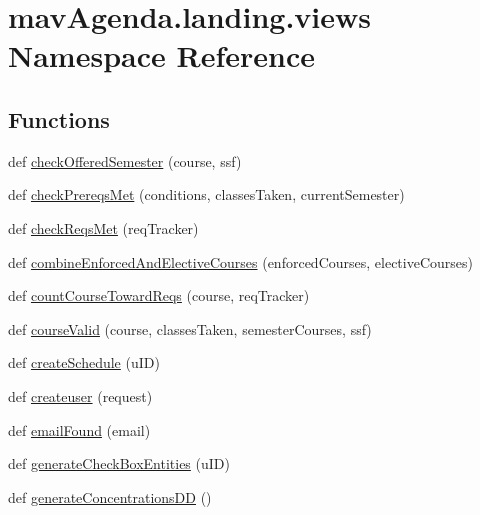 \hypertarget{namespacemavAgenda_1_1landing_1_1views}{}\section{mav\+Agenda.\+landing.\+views Namespace Reference}
\label{namespacemavAgenda_1_1landing_1_1views}
\subsection*{Functions}
\begin{DoxyCompactItemize}
\item 
def \mbox{\hyperlink{namespacemavAgenda_1_1landing_1_1views_ace0cc2158ed96baa96aed788e8a79ba0}{check\+Offered\+Semester}} (course, ssf)
\item 
def \mbox{\hyperlink{namespacemavAgenda_1_1landing_1_1views_ab39ff28312a049e51783d4b5c09c2889}{check\+Prereqs\+Met}} (conditions, classes\+Taken, current\+Semester)
\item 
def \mbox{\hyperlink{namespacemavAgenda_1_1landing_1_1views_afdf8c77f4b035382e2b1b73912edf180}{check\+Reqs\+Met}} (req\+Tracker)
\item 
def \mbox{\hyperlink{namespacemavAgenda_1_1landing_1_1views_a49d702ba4703d34075928e3b50d40137}{combine\+Enforced\+And\+Elective\+Courses}} (enforced\+Courses, elective\+Courses)
\item 
def \mbox{\hyperlink{namespacemavAgenda_1_1landing_1_1views_a760ef282377a3ca2be7eaf4254a99296}{count\+Course\+Toward\+Reqs}} (course, req\+Tracker)
\item 
def \mbox{\hyperlink{namespacemavAgenda_1_1landing_1_1views_ac91e55945f21284a5dc9abd24cac6690}{course\+Valid}} (course, classes\+Taken, semester\+Courses, ssf)
\item 
def \mbox{\hyperlink{namespacemavAgenda_1_1landing_1_1views_ae8b8edf7cc479127adfdee3c0ff1e9fe}{create\+Schedule}} (u\+ID)
\item 
def \mbox{\hyperlink{namespacemavAgenda_1_1landing_1_1views_aa998c2a3a45470fbe34a8d653246f471}{createuser}} (request)
\item 
def \mbox{\hyperlink{namespacemavAgenda_1_1landing_1_1views_a6a9fc857408512125072955d505bf8f3}{email\+Found}} (email)
\item 
def \mbox{\hyperlink{namespacemavAgenda_1_1landing_1_1views_a877af026df9866f8e1a7a106ea9809d2}{generate\+Check\+Box\+Entities}} (u\+ID)
\item 
def \mbox{\hyperlink{namespacemavAgenda_1_1landing_1_1views_a5a6480f4f25fb397610881b3e96e20a7}{generate\+Concentrations\+DD}} ()

\end{DoxyCompactItemize}
